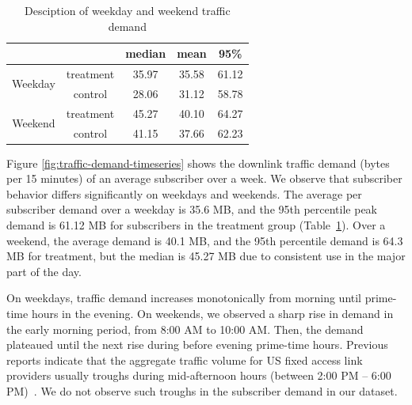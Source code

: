 \begin{table}[t]
\begin{tabular}{ cc | ccc }\\\hline
                         &           & median & mean  & 95\%  \\\hline
\multirow{2}{*}{Weekday} & treatment & 35.97  & 35.58 & 61.12 \\
                         & control   & 28.06  & 31.12 & 58.78 \\\hline
\multirow{2}{*}{Weekend} & treatment & 45.27  & 40.10 & 64.27 \\
                         & control   & 41.15  & 37.66 & 62.23 \\\hline
\end{tabular}
\caption{Desciption of weekday and weekend traffic demand}
\label{tab:traffic-demand-description}
\end{table}

Figure \ref{fig:traffic-demand-timeseries} shows the downlink traffic demand
(bytes per 15 minutes) of an average subscriber over a week. We observe that subscriber behavior differs
significantly on weekdays and weekends.  The average per subscriber
demand over a weekday is 35.6 MB, and the 95th percentile peak demand is 61.12 MB for
subscribers in the treatment group (Table~\ref{tab:traffic-demand-description}).
Over a weekend, the average demand is 40.1 MB, and the 95th percentile demand 
is 64.3 MB for treatment, but the median is 45.27 MB due to consistent use in the major part of the day.

On weekdays, traffic demand 
increases monotonically from morning until prime-time hours in the evening. On 
weekends, we observed a sharp rise in demand in the early morning period, from
8:00 AM to 10:00 AM. Then, the demand plateaued until the next rise during before
evening prime-time hours. Previous reports indicate that the aggregate traffic volume
for US fixed access link providers usually troughs during mid-afternoon hours 
(between 2:00 PM -- 6:00 PM)~\cite{sandvine20141h}. We do not observe such troughs
in the subscriber demand in our dataset.

